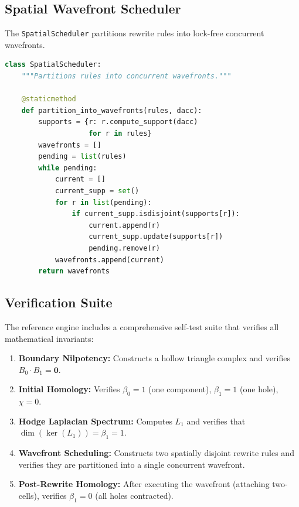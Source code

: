 \documentclass[manuscript, nonacm, review=false]{acmart}
\theoremstyle{definition}
\theoremstyle{plain}
\begin{document}
\subsection{Spatial Wavefront Scheduler}
\label{subsec:ref_scheduler}

The \texttt{SpatialScheduler} partitions rewrite rules into lock-free concurrent wavefronts.

\begin{lstlisting}[language=Python, caption={SpatialScheduler: Lock-free wavefront partitioning}, label={lst:scheduler}]
class SpatialScheduler:
    """Partitions rules into concurrent wavefronts."""
    
    @staticmethod
    def partition_into_wavefronts(rules, dacc):
        supports = {r: r.compute_support(dacc)
                    for r in rules}
        wavefronts = []
        pending = list(rules)
        while pending:
            current = []
            current_supp = set()
            for r in list(pending):
                if current_supp.isdisjoint(supports[r]):
                    current.append(r)
                    current_supp.update(supports[r])
                    pending.remove(r)
            wavefronts.append(current)
        return wavefronts
\end{lstlisting}


\subsection{Verification Suite}
\label{subsec:ref_verification}

The reference engine includes a comprehensive self-test suite that verifies all mathematical invariants:

\begin{enumerate}[label=\textbf{V\arabic*.}]
    \item \textbf{Boundary Nilpotency:} Constructs a hollow triangle complex and verifies $B_0 \cdot B_1 = \mathbf{0}$.
    \item \textbf{Initial Homology:} Verifies $\beta_0 = 1$ (one component), $\beta_1 = 1$ (one hole), $\chi = 0$.
    \item \textbf{Hodge Laplacian Spectrum:} Computes $L_1$ and verifies that $\dim(\ker(L_1)) = \beta_1 = 1$.
    \item \textbf{Wavefront Scheduling:} Constructs two spatially disjoint rewrite rules and verifies they are partitioned into a single concurrent wavefront.
    \item \textbf{Post-Rewrite Homology:} After executing the wavefront (attaching two-cells), verifies $\beta_1 = 0$ (all holes contracted).
\end{enumerate}
\end{document}
